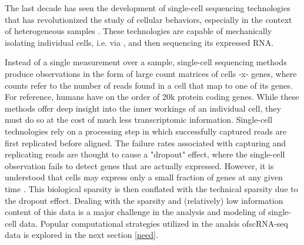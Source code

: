 
The last decade has seen the development of single-cell sequencing technologies
that has revolutionized the study of cellular behaviors, especially in the context of heterogeneous samples \cite{need}. %
These technologies are capable of mechanically isolating individual cells,
i.e. via %
, and then sequencing its expressed RNA.


Instead of a single measurement over a sample, single-cell sequencing methods produce observations in the form of large count matrices of cells -x- genes,
where counts refer to the number of reads found in a cell that map to one of its genes.
For reference, humans have on the order of 20k protein coding genes.
While these methods offer deep insight into the inner workings of an individual cell, they must do so at the cost of much less transcriptomic information.
Single-cell technologies rely on a processing step in which successfully captured reads are first replicated before aligned.
The failure rates associated with capturing and replicating reads are thought to cause a "dropout" effect, where the single-cell observation fails to detect genes that are actually expressed.
However, it is understood that cells may express only a small fraction of genes at any given time \cite{need}.
This biological sparsity is then conflated with the technical sparsity due to the dropout effect.
Dealing with the sparsity and (relatively) low information content of this data is a major challenge in the analysis and modeling of single-cell data.
Popular computational strategies utilized in the analsis ofscRNA-seq data is explored in the next section \ref{need}.


